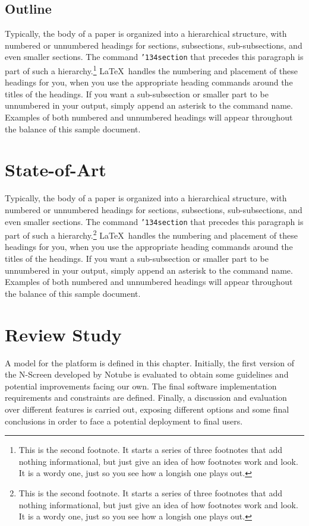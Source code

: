 \documentclass{acm_proc_article-sp}
\begin{document}
\subsection{Outline}
Typically, the body of a paper is organized
into a hierarchical structure, with numbered or unnumbered
headings for sections, subsections, sub-subsections, and even
smaller sections.  The command \texttt{{\char'134}section} that
precedes this paragraph is part of such a
hierarchy.\footnote{This is the second footnote.  It
starts a series of three footnotes that add nothing
informational, but just give an idea of how footnotes work
and look. It is a wordy one, just so you see
how a longish one plays out.} \LaTeX\ handles the numbering
and placement of these headings for you, when you use
the appropriate heading commands around the titles
of the headings.  If you want a sub-subsection or
smaller part to be unnumbered in your output, simply append an
asterisk to the command name.  Examples of both
numbered and unnumbered headings will appear throughout the
balance of this sample document.


\section{State-of-Art}
Typically, the body of a paper is organized
into a hierarchical structure, with numbered or unnumbered
headings for sections, subsections, sub-subsections, and even
smaller sections.  The command \texttt{{\char'134}section} that
precedes this paragraph is part of such a
hierarchy.\footnote{This is the second footnote.  It
starts a series of three footnotes that add nothing
informational, but just give an idea of how footnotes work
and look. It is a wordy one, just so you see
how a longish one plays out.} \LaTeX\ handles the numbering
and placement of these headings for you, when you use
the appropriate heading commands around the titles
of the headings.  If you want a sub-subsection or
smaller part to be unnumbered in your output, simply append an
asterisk to the command name.  Examples of both
numbered and unnumbered headings will appear throughout the
balance of this sample document.


\section{Review Study}
A model for the platform is defined in this chapter. Initially, the first version of the N-Screen developed by Notube\cite{aroyo2009notube} is evaluated to obtain some guidelines and potential improvements facing our own. The final software implementation requirements and constraints are defined. Finally, a discussion and evaluation over different features is carried out, exposing different options and some final conclusions in order to face a potential deployment to final users.
\end{document}
